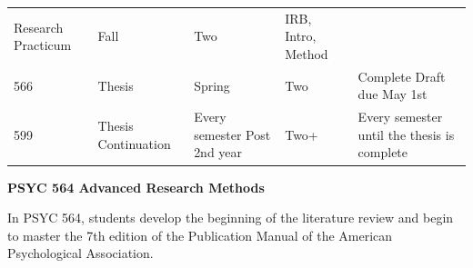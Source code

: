 \documentclass[
  openany]{book}
\begin{document}
\begin{longtable}[]{@{}lllll@{}}
\begin{minipage}[t]{0.27\columnwidth}
Research Practicum\strut
\end{minipage} & \begin{minipage}[t]{0.26\columnwidth}\raggedright
Fall\strut
\end{minipage} & \begin{minipage}[t]{0.10\columnwidth}\raggedright
Two\strut
\end{minipage} & \begin{minipage}[t]{0.19\columnwidth}\raggedright
IRB, Intro, Method\strut
\end{minipage}\tabularnewline
\begin{minipage}[t]{0.03\columnwidth}\raggedright
566\strut
\end{minipage} & \begin{minipage}[t]{0.27\columnwidth}\raggedright
Thesis\strut
\end{minipage} & \begin{minipage}[t]{0.26\columnwidth}\raggedright
Spring\strut
\end{minipage} & \begin{minipage}[t]{0.10\columnwidth}\raggedright
Two\strut
\end{minipage} & \begin{minipage}[t]{0.19\columnwidth}\raggedright
Complete Draft due May 1st\strut
\end{minipage}\tabularnewline
\begin{minipage}[t]{0.03\columnwidth}\raggedright
599\strut
\end{minipage} & \begin{minipage}[t]{0.27\columnwidth}\raggedright
Thesis Continuation\strut
\end{minipage} & \begin{minipage}[t]{0.26\columnwidth}\raggedright
Every semester Post 2nd year\strut
\end{minipage} & \begin{minipage}[t]{0.10\columnwidth}\raggedright
Two+\strut
\end{minipage} & \begin{minipage}[t]{0.19\columnwidth}\raggedright
Every semester until the thesis is complete\strut
\end{minipage}\tabularnewline
\bottomrule
\end{longtable}

\textbf{PSYC 564 Advanced Research Methods}

In PSYC 564, students develop the beginning of the literature review and begin to master the 7th edition of the Publication Manual of the American Psychological Association.
\end{document}
